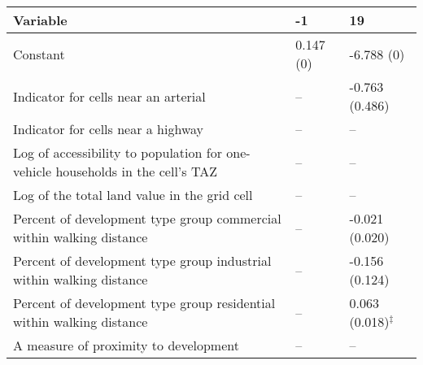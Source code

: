 
\begin{tabular}{p{3in}p{0.5in}p{0.5in}}
\hline\hline
Variable & -1 & 19 \\\hline
Constant & 0.147 (0) & -6.788 (0) \\
Indicator for cells near an arterial & -- & -0.763 (0.486) \\
Indicator for cells near a highway & -- & -- \\
Log of accessibility to population for one-vehicle households in the cell's TAZ & -- & -- \\
Log of the total land value in the grid cell & -- & -- \\
Percent of development type group commercial within walking distance & -- & -0.021 (0.020) \\
Percent of development type group industrial within walking distance & -- & -0.156 (0.124) \\
Percent of development type group residential within walking distance & -- & 0.063 (0.018)$^{\ddagger}$ \\
A measure of proximity to development & -- & -- \\
\hline\hline
\end{tabular}
